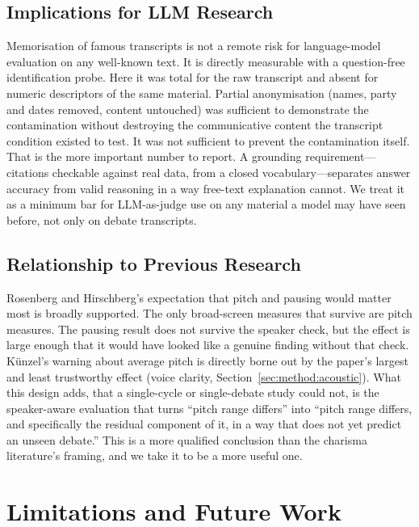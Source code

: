 \documentclass[pdflatex,sn-mathphys-num]{sn-jnl}%
\begin{document}
\subsection{Implications for LLM Research}
\label{sec:disc:llm}

Memorisation of famous transcripts is not a remote risk for
language-model evaluation on any well-known text. It is directly
measurable with a question-free identification probe. Here it was
total for the raw transcript and absent for numeric descriptors of the same
material. Partial anonymisation (names, party and dates removed, content
untouched) was sufficient to demonstrate the contamination without
destroying the communicative content the transcript condition existed to
test. It was not sufficient to prevent the contamination itself. That
is the more important number to report. A grounding
requirement---citations checkable against real data, from a closed
vocabulary---separates answer accuracy from valid reasoning in a way
free-text explanation cannot. We treat it as a minimum bar for
LLM-as-judge use on any material a model may have seen before, not only on
debate transcripts.

\subsection{Relationship to Previous Research}
\label{sec:disc:relationship}

Rosenberg and Hirschberg's \cite{rosenberg2009acoustic} expectation that
pitch and pausing would matter most is broadly supported. The only
broad-screen measures that survive are pitch measures. The pausing
result does not survive the speaker check, but the effect is large enough
that it would have looked like a genuine finding without that check. K\"unzel's
\cite{kunzel1989speakers} warning about average pitch is directly borne out
by the paper's largest and least trustworthy effect (voice clarity,
Section~\ref{sec:method:acoustic}). What this design adds, that a
single-cycle or single-debate study could not, is the speaker-aware
evaluation that turns ``pitch range differs'' into ``pitch range differs,
and specifically the residual component of it, in a way that does not yet
predict an unseen debate.'' This is a more qualified conclusion than the
charisma literature's framing, and we take it to be a more useful one.

\section{Limitations and Future Work}
\label{sec:concl:limits}
\end{document}
